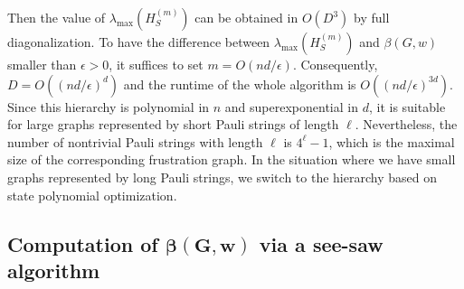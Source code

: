 \documentclass[
12pt,
prx,
aps,
reprint,
a4paper,
longbibliograph,
nofootinbib,
nobibnotes,
superscriptaddress
]{revtex4-2}
\theoremstyle{definition}
\begin{document}
Then the value of $\lambda_{\max}(H_S^{(m)})$ can be obtained in $O(D^3)$ by full diagonalization.
To have the difference between $\lambda_{\max}(H_S^{(m)})$ and $\beta(G,w)$ smaller than $\epsilon > 0$, it suffices to set $m = O(nd/\epsilon)$. Consequently, $D = O((nd/\epsilon)^d)$ and the runtime of the whole algorithm is $O((nd/\epsilon)^{3d})$.
Since this hierarchy is polynomial in $n$ and superexponential in $d$, it is suitable for large graphs represented by short Pauli strings of length $\ell$.
Nevertheless, the number of nontrivial Pauli strings with length $\ell$ is $4^\ell - 1$, which is the maximal size of the corresponding frustration graph.
In the situation where we have small graphs represented by long Pauli strings, we switch to the hierarchy based on state polynomial optimization.


\subsection{\texorpdfstring{Computation of $\mathbf{\beta(G,w)}$ via a see-saw algorithm}{}}
\end{document}
